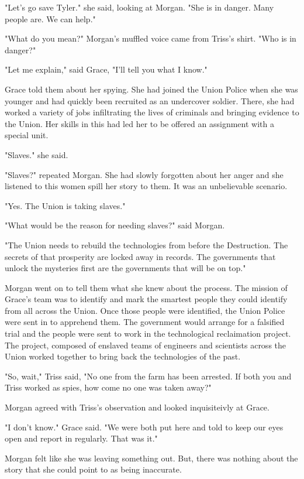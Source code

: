 \documentclass[courier]{sffms}
\begin{document}
"Let's go save Tyler." she said, looking at Morgan.
"She is in danger. Many people are. We can help."

"What do you mean?" Morgan's muffled voice
came from Triss's shirt. "Who is in danger?"

"Let me explain," said Grace, "I'll tell you what
I know."

Grace told them about her spying. She had joined
the Union Police when she was younger and had
quickly been recruited as an undercover soldier.
There, she had worked a variety of jobs infiltrating
the lives of criminals and bringing evidence to the
Union. Her skills in this had led her to be offered an
assignment with a special unit.

"Slaves." she said.

"Slaves?" repeated Morgan. She had slowly forgotten
about her anger and she listened to this women
spill her story to them. It was an unbelievable
scenario.

"Yes. The Union is taking slaves."

"What would be the reason for needing slaves?" said
Morgan.

"The Union needs to rebuild the technologies from
before the Destruction. The secrets of that prosperity
are locked away in records. The governments that
unlock the mysteries first are the governments that
will be on top."

Morgan went on to tell them what she knew about
the process. The mission of Grace's team was 
to identify and mark the smartest people they could
identify from all across the Union. Once those people
were identified, the Union Police were sent in to
apprehend them. The government would arrange for
a falsified trial and the people were sent to work in
the technological reclaimation project. The project,
composed of enslaved teams of engineers and scientists
across the Union worked together to bring back
the technologies of the past.

"So, wait," Triss said, "No one from the farm has been arrested.
If both you and Triss worked as spies, how come no one
was taken away?"

Morgan agreed with Triss's observation and looked inquisiteivly
at Grace.

"I don't know." Grace said. "We were both put here and told
to keep our eyes open and report in regularly. That was it."

Morgan felt like she was leaving something out. But, there
was nothing about the story that she could point to as being
inaccurate.
\end{document}
